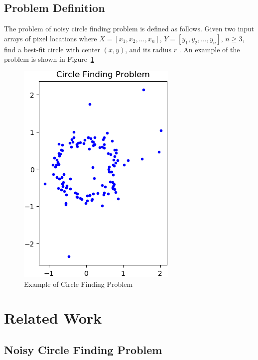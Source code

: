 \documentclass[10pt,twocolumn,letterpaper]{article}
\begin{document}
\subsection{Problem Definition}

The problem of noisy circle finding problem is defined as follows. Given two input arrays of pixel locations where $X = [x_{1}, x_{2}, \dots, x_{n}]$, $Y = [y_{1}, y_{2}, \dots, y_{n}]$, $n \geq 3$, find a best-fit circle with center $(x, y)$, and its radius $r$ \cite{NoisyCircleFindingProblem}. An example of the problem is shown in Figure~\ref{fig:circle_finding}

\begin{figure}[!htp]
   \centering
   \includegraphics[width=0.6\linewidth]{./images/noisy_circle.png}
   \caption{Example of Circle Finding Problem}
   \label{fig:circle_finding}
\end{figure}


\section{Related Work}
\label{section:related_work}


\subsection{Noisy Circle Finding Problem}
\end{document}
